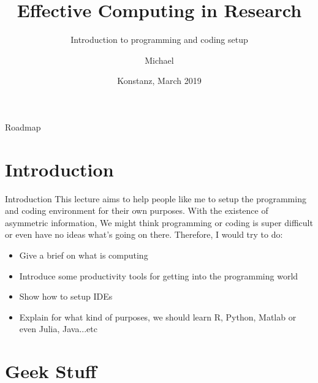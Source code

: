 \documentclass[handout]{beamer} %
\title[]{Effective Computing in Research}
\subtitle{Introduction to programming and coding setup}
\author []%
{Michael \inst{} \inst{}}
\date[] %
{Konstanz, March 2019}
\begin{document}
\begin{frame}[noframenumbering]
  \titlepage
\end{frame}

\begin{frame}{Roadmap}
	\tableofcontents
\end{frame}



\section{Introduction}

\begin{frame}{Introduction}
	This lecture aims to help people like me to setup the programming and coding environment for their own purposes. With the existence of asymmetric information, We might think programming or coding is super difficult or even have no ideas what's going on there. Therefore, I would try to do:
\begin{itemize}
	\item Give a brief on what is computing
	\item Introduce some productivity tools for getting into the programming world
	\item Show how to setup IDEs
	\item Explain for what kind of purposes, we should learn R, Python, Matlab or even Julia, Java...etc
\end{itemize}
\end{frame}




\section{Geek Stuff}
\end{document}
